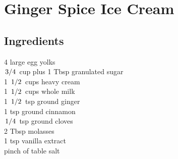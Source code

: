 \documentclass{article}
\begin{document}
\newcommand{\slfrac}[2]{\left.#1\middle/#2\right.}
\newcommand{\degree}{\ensuremath{^\circ}}

\section*{Ginger Spice Ice Cream}



\subsection*{Ingredients}
4 large egg yolks\\
$\slfrac{3}{4}$ cup plus 1 Tbsp granulated sugar\\
1 $\slfrac{1}{2}$ cups heavy cream\\
1 $\slfrac{1}{2}$ cups whole milk\\
1 $\slfrac{1}{2}$ tsp ground ginger\\
1 tsp ground cinnamon\\
$\slfrac{1}{4}$ tsp ground cloves\\
2 Tbsp molasses\\
1 tsp vanilla extract\\
pinch of table salt\\
\end{document}

